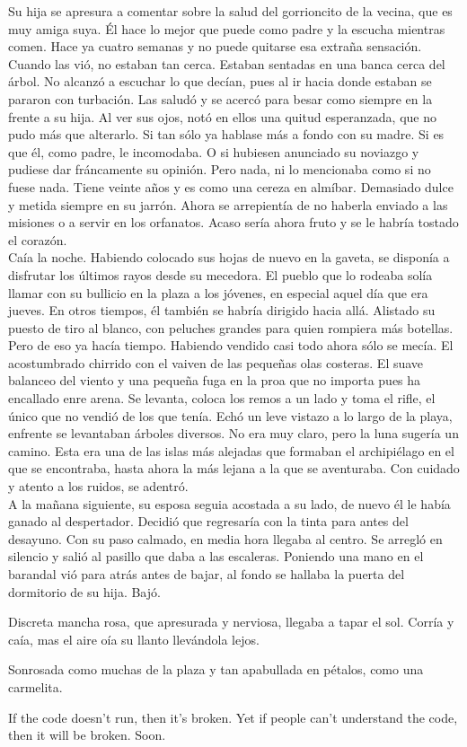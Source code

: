 Su hija se apresura a comentar sobre la salud del gorrioncito de la vecina, que es muy amiga suya. Él hace lo mejor que puede como padre y la escucha mientras comen. Hace ya cuatro semanas y no puede quitarse esa extraña sensación. Cuando las vió, no estaban tan cerca. Estaban sentadas en una banca cerca del árbol. No alcanzó a escuchar lo que decían, pues al ir hacia donde estaban se pararon con turbación. Las saludó y se acercó para besar como siempre en la frente a su hija. Al ver sus ojos, notó en ellos una quitud esperanzada, que no pudo más que alterarlo. Si tan sólo ya hablase más a fondo con su madre. Si es que él, como padre, le incomodaba. O si hubiesen anunciado su noviazgo y pudiese dar fráncamente su opinión. Pero nada, ni lo mencionaba como si no fuese nada. Tiene veinte años y es como una cereza en almíbar. Demasiado dulce y metida siempre en su jarrón. Ahora se arrepientía de no haberla enviado a las misiones o a servir en los orfanatos. Acaso sería ahora fruto y se le habría tostado el corazón. \\[0.2cm]

Caía la noche. Habiendo colocado sus hojas de nuevo en la gaveta, se disponía a disfrutar los últimos rayos desde su mecedora. El pueblo que lo rodeaba solía llamar con su bullicio en la plaza a los jóvenes, en especial aquel día que era jueves. En otros tiempos, él también se habría dirigido hacia allá. Alistado su puesto de tiro al blanco, con peluches grandes para quien rompiera más botellas. Pero de eso ya hacía tiempo. Habiendo vendido casi todo ahora sólo se mecía. El acostumbrado chirrido con el vaiven de las pequeñas olas costeras. El suave balanceo del viento y una pequeña fuga en la proa que no importa pues ha encallado enre arena. Se levanta, coloca los remos a un lado y toma el rifle, el único que no vendió de los que tenía. Echó un leve vistazo a lo largo de la playa, enfrente se levantaban árboles diversos. No era muy claro, pero la luna sugería un camino. Esta era una de las islas más alejadas que formaban el archipiélago en el que se encontraba, hasta ahora la más lejana a la que se aventuraba. Con cuidado y atento a los ruidos, se adentró.\\[0.2cm]

A la mañana siguiente, su esposa seguia acostada a su lado, de nuevo él le había ganado al despertador. Decidió que regresaría con la tinta para antes del desayuno. Con su paso calmado, en media hora llegaba al centro. Se arregló en silencio y salió al pasillo que daba a las escaleras. Poniendo una mano en el barandal vió para atrás antes de bajar, al fondo se hallaba la puerta del dormitorio de su hija. Bajó.



Discreta mancha rosa, que apresurada y nerviosa, llegaba a tapar el sol. Corría y caía, mas el aire oía su llanto llevándola lejos.

Sonrosada como muchas de la plaza y tan apabullada en pétalos, como una carmelita.

If the code doesn’t run, then it’s broken. Yet if people can’t understand the code, then it will be broken. Soon.
